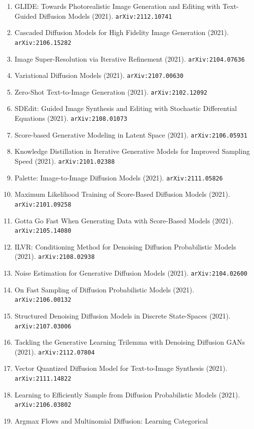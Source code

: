 \documentclass[11pt]{article}
\begin{document}
\begin{enumerate}
  \item GLIDE: Towards Photorealistic Image Generation and Editing with
  Text-Guided Diffusion Models (2021). \texttt{arXiv:2112.10741}
  \item Cascaded Diffusion Models for High Fidelity Image Generation (2021). \texttt{arXiv:2106.15282}
  \item Image Super-Resolution via Iterative Refinement (2021). \texttt{arXiv:2104.07636}
  \item Variational Diffusion Models (2021). \texttt{arXiv:2107.00630}
  \item Zero-Shot Text-to-Image Generation (2021). \texttt{arXiv:2102.12092}
  \item SDEdit: Guided Image Synthesis and Editing with Stochastic Differential
  Equations (2021). \texttt{arXiv:2108.01073}
  \item Score-based Generative Modeling in Latent Space (2021). \texttt{arXiv:2106.05931}
  \item Knowledge Distillation in Iterative Generative Models for Improved
  Sampling Speed (2021). \texttt{arXiv:2101.02388}
  \item Palette: Image-to-Image Diffusion Models (2021). \texttt{arXiv:2111.05826}
  \item Maximum Likelihood Training of Score-Based Diffusion Models (2021). \texttt{arXiv:2101.09258}
  \item Gotta Go Fast When Generating Data with Score-Based Models (2021). \texttt{arXiv:2105.14080}
  \item ILVR: Conditioning Method for Denoising Diffusion Probabilistic Models (2021). \texttt{arXiv:2108.02938}
  \item Noise Estimation for Generative Diffusion Models (2021). \texttt{arXiv:2104.02600}
  \item On Fast Sampling of Diffusion Probabilistic Models (2021). \texttt{arXiv:2106.00132}
  \item Structured Denoising Diffusion Models in Discrete State-Spaces (2021). \texttt{arXiv:2107.03006}
  \item Tackling the Generative Learning Trilemma with Denoising Diffusion GANs (2021). \texttt{arXiv:2112.07804}
  \item Vector Quantized Diffusion Model for Text-to-Image Synthesis (2021). \texttt{arXiv:2111.14822}
  \item Learning to Efficiently Sample from Diffusion Probabilistic Models (2021). \texttt{arXiv:2106.03802}
  \item Argmax Flows and Multinomial Diffusion: Learning Categorical

\end{enumerate}
\end{document}

